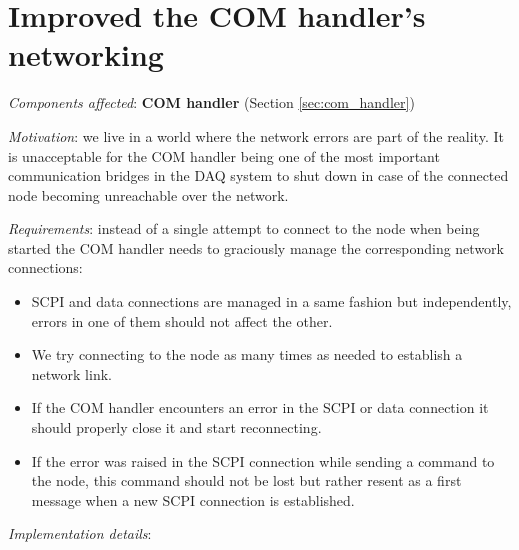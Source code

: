 \section{Improved the COM handler's networking}
\label{sec:com_handler_network_errors}

\textit{Components affected}: \textbf{COM handler} (Section \ref{sec:com_handler})

\textit{Motivation}: we live in a world where the network errors are part of the reality. It is unacceptable for the COM handler being one of the most important communication bridges in the DAQ system to shut down in case of the connected node becoming unreachable over the network.

\textit{Requirements}: instead of a single attempt to connect to the node when being started the COM handler needs to graciously manage the corresponding network connections:

\begin{itemize}
	\item SCPI and data connections are managed in a same fashion but independently, errors in one of them should not affect the other.
	\item We try connecting to the node as many times as needed to establish a network link.
	\item If the COM handler encounters an error in the SCPI or data connection it should properly close it and start reconnecting.
	\item If the error was raised in the SCPI connection while sending a command to the node, this command should not be lost but rather resent as a first message when a new SCPI connection is established.
\end{itemize}

\textit{Implementation details}:

